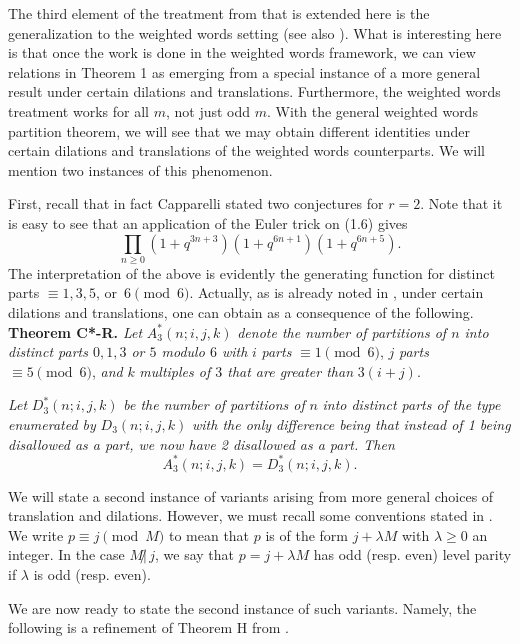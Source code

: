 \documentclass[12pt,a4paper]{amsart}
\theoremstyle{definition}
\theoremstyle{notation}
\theoremstyle{corollary}
\begin{document}
The third element of the treatment from \cite{KAGEABG95} that is extended here is the generalization to the weighted words setting (see also \cite{KABG93-2}).  What is interesting here is that once the work is done in the weighted words framework, we can view relations in Theorem 1 as emerging from a special instance of a more general result under certain dilations and translations. Furthermore, the weighted words treatment works for all $m$, not just odd $m$. With the general weighted words partition theorem, we will see that we may obtain different identities under certain dilations and translations of the weighted words counterparts. We will mention two instances of this phenomenon.

First, recall that in fact Capparelli stated two conjectures for $r=2$. Note that it is easy to see that an application of the Euler trick on (1.6) gives 
\[\prod_{n\geq0}(1+q^{3n+3})(1+q^{6n+1})(1+q^{6n+5}).\]
The interpretation of the above is evidently the generating function for distinct parts $\equiv 1,3,5, \,\text{or}\,\,\, 6\pmod 6$. Actually, as is already noted in \cite{KAGEABG95}, under certain dilations and translations, one can obtain as a consequence of \cite[Thm.~3]{KAGEABG95} the following.\\

\textbf{Theorem C*-R.}{\it{ Let}} $A_3^*(n;i,j,k)$ {\it{denote the number of partitions of $n$ into distinct parts  $0, 1, 3$ or $ 5$ modulo $6$ with}} $i$ {\it{parts}} $\equiv 1\pmod{6}$, $j$ {\it{parts}} $\equiv 5 \pmod{6}$, {\it{and}}  $k$ {\it{multiples of $3$ that are greater than}} $3(i+j)$. 


{\it{Let}} $D_3^*(n;i,j,k)$ {\it{be the number of partitions of}} $n$ {\it{into distinct parts of the type enumerated by}} $D_3(n;i,j,k)$ {\it{with the only difference being that instead of 1 being disallowed as a part, we now have 2 disallowed as a part. Then}}
$$
A_3^*(n;i,j,k)=D_3^*(n;i,j,k).
$$


\bigskip



We will state a second instance of variants arising from more general choices of translation and dilations. However,  we must recall some conventions stated in \cite{YAKA25}. We write $p\equiv j\pmod{M}$ to mean that $p$ is of the form $j+\lambda M$ with $\lambda\ge 0$ an integer.  In the case $M\!\not|\,j$, we say that  $p=j+\lambda M$ has odd (resp. even) level parity if  $\lambda$ is odd (resp. even).


We are now ready to state the second instance of such variants. Namely, the following is a refinement of Theorem H from \cite{YAKA25}.\\
\end{document}

